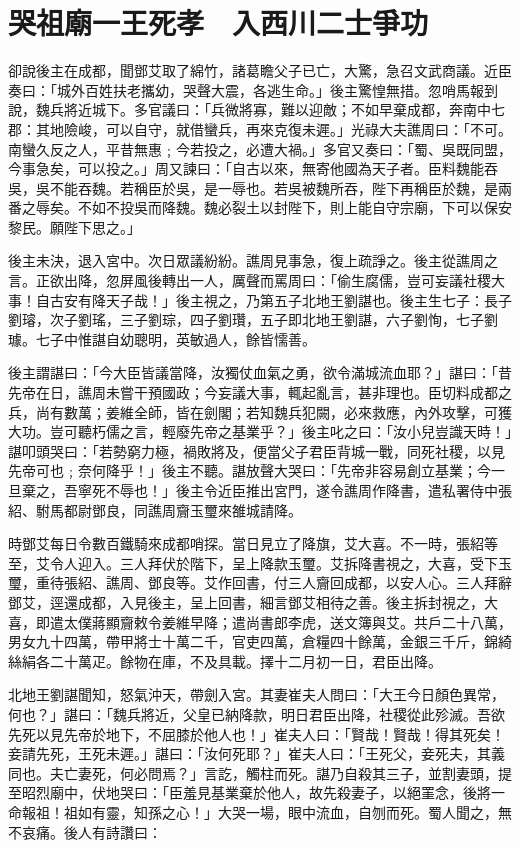 
\chapter{哭祖廟一王死孝　入西川二士爭功}

卻說後主在成都，聞鄧艾取了綿竹，諸葛瞻父子已亡，大驚，急召文武商議。近臣奏曰：「城外百姓扶老攜幼，哭聲大震，各逃生命。」後主驚惶無措。忽哨馬報到說，魏兵將近城下。多官議曰：「兵微將寡，難以迎敵；不如早棄成都，奔南中七郡：其地險峻，可以自守，就借蠻兵，再來克復未遲。」光祿大夫譙周曰：「不可。南蠻久反之人，平昔無惠﹔今若投之，必遭大禍。」多官又奏曰：「蜀、吳既同盟，今事急矣，可以投之。」周又諫曰：「自古以來，無寄他國為天子者。臣料魏能吞吳，吳不能吞魏。若稱臣於吳，是一辱也。若吳被魏所吞，陛下再稱臣於魏，是兩番之辱矣。不如不投吳而降魏。魏必裂土以封陛下，則上能自守宗廟，下可以保安黎民。願陛下思之。」

後主未決，退入宮中。次日眾議紛紛。譙周見事急，復上疏諍之。後主從譙周之言。正欲出降，忽屏風後轉出一人，厲聲而罵周曰：「偷生腐儒，豈可妄議社稷大事！自古安有降天子哉！」後主視之，乃第五子北地王劉諶也。後主生七子：長子劉璿，次子劉瑤，三子劉琮，四子劉瓚，五子即北地王劉諶，六子劉恂，七子劉璩。七子中惟諶自幼聰明，英敏過人，餘皆懦善。

後主謂諶曰：「今大臣皆議當降，汝獨仗血氣之勇，欲令滿城流血耶？」諶曰：「昔先帝在日，譙周未嘗干預國政；今妄議大事，輒起亂言，甚非理也。臣切料成都之兵，尚有數萬；姜維全師，皆在劍閣；若知魏兵犯闕，必來救應，內外攻擊，可獲大功。豈可聽朽儒之言，輕廢先帝之基業乎？」後主叱之曰：「汝小兒豈識天時！」諶叩頭哭曰：「若勢窮力極，禍敗將及，便當父子君臣背城一戰，同死社稷，以見先帝可也﹔奈何降乎！」後主不聽。諶放聲大哭曰：「先帝非容易創立基業；今一旦棄之，吾寧死不辱也！」後主令近臣推出宮門，遂令譙周作降書，遣私署侍中張紹、駙馬都尉鄧良，同譙周齎玉璽來雒城請降。

時鄧艾每日令數百鐵騎來成都哨探。當日見立了降旗，艾大喜。不一時，張紹等至，艾令人迎入。三人拜伏於階下，呈上降款玉璽。艾拆降書視之，大喜，受下玉璽，重待張紹、譙周、鄧良等。艾作回書，付三人齎回成都，以安人心。三人拜辭鄧艾，逕還成都，入見後主，呈上回書，細言鄧艾相待之善。後主拆封視之，大喜，即遣太僕蔣顯齎敕令姜維早降；遣尚書郎李虎，送文簿與艾。共戶二十八萬，男女九十四萬，帶甲將士十萬二千，官吏四萬，倉糧四十餘萬，金銀三千斤，錦綺絲絹各二十萬疋。餘物在庫，不及具載。擇十二月初一日，君臣出降。

北地王劉諶聞知，怒氣沖天，帶劍入宮。其妻崔夫人問曰：「大王今日顏色異常，何也？」諶曰：「魏兵將近，父皇已納降款，明日君臣出降，社稷從此殄滅。吾欲先死以見先帝於地下，不屈膝於他人也！」崔夫人曰：「賢哉！賢哉！得其死矣！妾請先死，王死未遲。」諶曰：「汝何死耶？」崔夫人曰：「王死父，妾死夫，其義同也。夫亡妻死，何必問焉？」言訖，觸柱而死。諶乃自殺其三子，並割妻頭，提至昭烈廟中，伏地哭曰：「臣羞見基業棄於他人，故先殺妻子，以絕罣念，後將一命報祖！祖如有靈，知孫之心！」大哭一場，眼中流血，自刎而死。蜀人聞之，無不哀痛。後人有詩讚曰：

